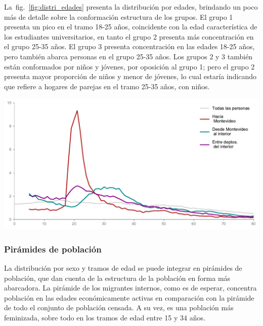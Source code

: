 \documentclass[12pt,spanish,]{article}
\let\origfigure\figure
\let\endorigfigure\endfigure
\renewenvironment{figure}[1][2] {
    \expandafter\origfigure\expandafter[H]
} {
    \endorigfigure
}
\begin{document}
La~fig.~\ref{fig:distri_edades} presenta la distribución por edades,
brindando un poco más de detalle sobre la conformación estructura de los
grupos. El grupo 1 presenta un pico en el tramo 18-25 años, coincidente
con la edad característica de los estudiantes universitarios, en tanto
el grupo 2 presenta más concentración en el grupo 25-35 años. El grupo 3
presenta concentración en las edades 18-25 años, pero también abarca
personas en el grupo 25-35 años. Los grupos 2 y 3 también están
conformados por niños y jóvenes, por oposición al grupo 1; pero el grupo
2 presenta mayor proporción de niños y menor de jóvenes, lo cual estaría
indicando que refiere a hogares de parejas en el tramo 25-35 años, con
niños.

\begin{figure}
\hypertarget{fig:distri_edades}{%
\centering
\includegraphics{./tex2pdf.-8c1f0593c1a83dbe/2cc2f92e9c80908b688429b7d753e4b33361e702.pdf}
\caption{Distribución de edades, porcentaje dentro de cada
grupo.}\label{fig:distri_edades}
}
\end{figure}

\hypertarget{piruxe1mides-de-poblaciuxf3n}{%
\subsubsection{Pirámides de
población}\label{piruxe1mides-de-poblaciuxf3n}}

La distribución por sexo y tramos de edad se puede integrar en pirámides
de población, que dan cuenta de la estructura de la población en forma
más abarcadora. La pirámide de los migrantes internos, como es de
esperar, concentra población en las edades económicamente activas en
comparación con la pirámide de todo el conjunto de población censada. A
su vez, es una población más feminizada, sobre todo en los tramos de
edad entre 15 y 34 años.
\end{document}
